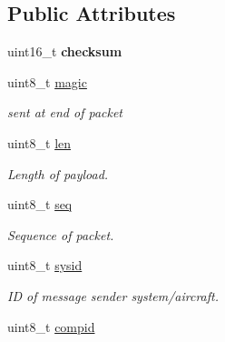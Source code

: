 \subsection*{Public Attributes}
\begin{DoxyCompactItemize}
\item 
\hypertarget{struct____mavlink__message_a8c200d7751471b5ac54d090ba279a5a6}{uint16\+\_\+t {\bfseries checksum}}\label{struct____mavlink__message_a8c200d7751471b5ac54d090ba279a5a6}

\item 
uint8\+\_\+t \hyperlink{struct____mavlink__message_a2e6ee9d46821aea33a08231dea000355}{magic}
\begin{DoxyCompactList}\small\item\em sent at end of packet \end{DoxyCompactList}\item 
\hypertarget{struct____mavlink__message_a6a405c678e4b9fe57e5e621c5bcd4841}{uint8\+\_\+t \hyperlink{struct____mavlink__message_a6a405c678e4b9fe57e5e621c5bcd4841}{len}}\label{struct____mavlink__message_a6a405c678e4b9fe57e5e621c5bcd4841}

\begin{DoxyCompactList}\small\item\em Length of payload. \end{DoxyCompactList}\item 
\hypertarget{struct____mavlink__message_aae05bedaab3c62acaccb416478490eff}{uint8\+\_\+t \hyperlink{struct____mavlink__message_aae05bedaab3c62acaccb416478490eff}{seq}}\label{struct____mavlink__message_aae05bedaab3c62acaccb416478490eff}

\begin{DoxyCompactList}\small\item\em Sequence of packet. \end{DoxyCompactList}\item 
\hypertarget{struct____mavlink__message_ad4bfd4108688429b30940a35b44d4dd3}{uint8\+\_\+t \hyperlink{struct____mavlink__message_ad4bfd4108688429b30940a35b44d4dd3}{sysid}}\label{struct____mavlink__message_ad4bfd4108688429b30940a35b44d4dd3}

\begin{DoxyCompactList}\small\item\em I\+D of message sender system/aircraft. \end{DoxyCompactList}\item 
\hypertarget{struct____mavlink__message_a83ed773c359ffe4a8d0746f82af2b44d}{uint8\+\_\+t \hyperlink{struct____mavlink__message_a83ed773c359ffe4a8d0746f82af2b44d}{compid}}\label{struct____mavlink__message_a83ed773c359ffe4a8d0746f82af2b44d}


\end{DoxyCompactItemize}
